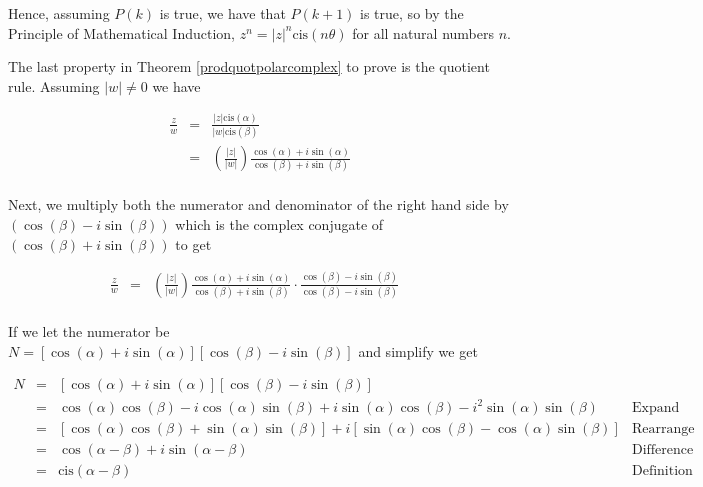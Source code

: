 \documentclass{ximera}
\begin{document}
Hence, assuming $P(k)$ is true, we have that $P(k+1)$ is true, so by the Principle of Mathematical Induction, $z^{n} = |z|^{n} \text{cis}(n \theta)$ for all natural numbers $n$. 

 

The last property in Theorem \ref{prodquotpolarcomplex} to prove is the quotient rule.   Assuming $|w| \neq 0$ we have

\[ \begin{array}{rcl}

\frac{z}{w} & = & \frac{|z| \text{cis}(\alpha)}{|w| \text{cis}(\beta)}  \\  
& = & \left( \frac{|z|}{|w|}\right) \frac{\cos(\alpha) + i \sin(\alpha)}{\cos(\beta) + i \sin(\beta)}   \\ 		 \end{array}\]
						 
Next, we multiply both the numerator and denominator of the right hand side by $(\cos(\beta) - i \sin(\beta))$ which is the complex conjugate of $(\cos(\beta) + i \sin(\beta))$ to get

\[\begin{array}{rcll}

\frac{z}{w}	& = & \left( \frac{|z|}{|w|}\right) \frac{\cos(\alpha) + i \sin(\alpha)}{\cos(\beta) + i \sin(\beta)} \cdot \frac{\cos(\beta) - i \sin(\beta)}{\cos(\beta) - i \sin(\beta)} & \\ \end{array}\]

If we let the numerator be $N = \left[\cos(\alpha) + i \sin(\alpha)\right] \left[\cos(\beta) - i \sin(\beta)\right]$ and simplify we get

\[ \begin{array}{rcll}
N & = & \left[\cos(\alpha) + i \sin(\alpha)\right] \left[\cos(\beta) - i \sin(\beta)\right] & \\
  & = & \cos(\alpha)\cos(\beta)-i\cos(\alpha)\sin(\beta)  + i \sin(\alpha)\cos(\beta) - i^2 \sin(\alpha)\sin(\beta) & \text{Expand} \\
	& = & \left[\cos(\alpha)\cos(\beta)+\sin(\alpha)\sin(\beta)\right] + i\left[\sin(\alpha)\cos(\beta) -\cos(\alpha)\sin(\beta)  \right] & \text{Rearrange and Factor} \\
	& = & \cos(\alpha - \beta) + i \sin(\alpha - \beta)  & \text{Difference Identities}  \\
	& = & \text{cis}(\alpha - \beta)& \text{Definition of `cis'} \\ \end{array} \]
	
\end{document}
